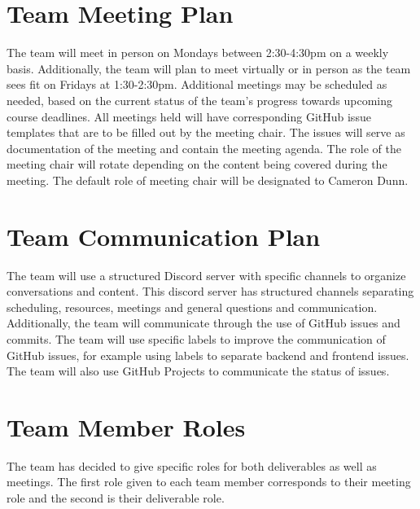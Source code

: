 \documentclass{article}
\begin{document}


\section{Team Meeting Plan}

The team will meet in person on Mondays between 2:30-4:30pm on a weekly basis. 
Additionally, the team will plan to meet virtually or in person as the team sees fit on Fridays at 1:30-2:30pm.
Additional meetings may be scheduled as needed, based on the current status of the team's progress towards upcoming course deadlines. 
All meetings held will have corresponding GitHub issue templates that are to be filled out by the meeting chair. The issues will serve as documentation of the meeting and contain the meeting agenda.
The role of the meeting chair will rotate depending on the content being covered during the meeting. 
The default role of meeting chair will be designated to Cameron Dunn. 



\section{Team Communication Plan}

The team will use a structured Discord server with specific channels to organize conversations and content. 
This discord server has structured channels separating scheduling, resources, meetings and general questions and communication. 
Additionally, the team will communicate through the use of GitHub issues and commits. 
The team will use specific labels to improve the communication of GitHub issues, for example using labels to separate backend and frontend issues. 
The team will also use GitHub Projects to communicate the status of issues. 

\section{Team Member Roles}

The team has decided to give specific roles for both deliverables as well as meetings. 
The first role given to each team member corresponds to their meeting role and the second is their deliverable role.
\end{document}
